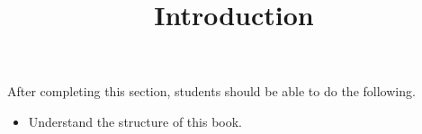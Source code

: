 \documentclass{ximera}
\title{Introduction}
\begin{document}
\begin{abstract}
\end{abstract}

\maketitle

\begin{sectionOutcomes}

After completing this section, students should be able to do the following.

\begin{itemize}
\item Understand the structure of this book.
\end{itemize}

\end{sectionOutcomes}
\end{document}
